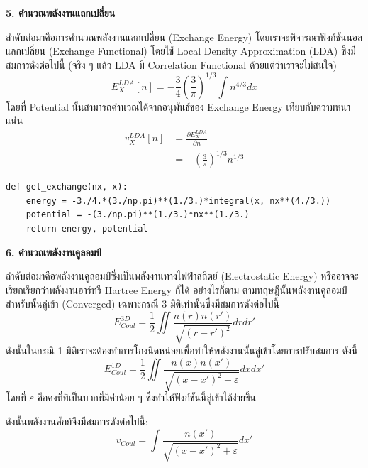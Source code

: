 \noindent \textbf{5. คำนวณพลังงานแลกเปลี่ยน}

ลำดับต่อมาคือการคำนวณพลังงานแลกเปลี่ยน (Exchange Energy) โดยเราจะพิจารณาฟังก์ชันนอลแลกเปลี่ยน (Exchange Functional) โดยใช้ Local Density Approximation (LDA) ซึ่งมีสมการดังต่อไปนี้ (จริง ๆ แล้ว LDA มี Correlation Functional ด้วยแต่ว่าเราจะไม่สนใจ)
%
\begin{equation}
    E_X^{LDA}[n] = -\frac{3}{4} \left(\frac{3}{\pi}\right)^{1/3} \int n^{4/3} dx
\end{equation}
%
\noindent โดยที่ Potential นั้นสามารถคำนวณได้จากอนุพันธ์ของ Exchange Energy เทียบกับความหนาแน่น
%
\begin{align}
    v_X^{LDA}[n] & = \frac{\partial E_X^{LDA}}{\partial n} \nonumber \\
                 & = - \left(\frac{3}{\pi}\right)^{1/3} n^{1/3}
\end{align}

\vspace{1em}

\begin{lstlisting}[style=MyPython]
def get_exchange(nx, x):
    energy = -3./4.*(3./np.pi)**(1./3.)*integral(x, nx**(4./3.))
    potential = -(3./np.pi)**(1./3.)*nx**(1./3.)
    return energy, potential
\end{lstlisting}

\vspace{1em}

\noindent \textbf{6. คำนวณพลังงานคูลอมป์}

ลำดับต่อมาคือพลังงานคูลอมป์ซึ่งเป็นพลังงานทางไฟฟ้าสถิตย์ (Electrostatic Energy) หรืออาจจะเรียกเรียกว่าพลังงานฮาร์ทรี Hartree Energy ก็ได้ อย่างไรก็ตาม ตามทฤษฎีนั้นพลังงานคูลอมป์สำหรับนั้นลู่เข้า (Converged) เฉพาะกรณี 3 มิติเท่านั้นซึ่งมีสมการดังต่อไปนี้
%
\begin{equation}
    E^{3D}_{Coul} = \frac{1}{2}\iint \frac{n(r)n(r')}{\sqrt{(r-r')^2}}drdr'
\end{equation}
%
\noindent ดังนั้นในกรณี 1 มิติเราจะต้องทำการโกงนิดหน่อยเพื่อทำให้พลังงานนั้นลู่เข้าโดยการปรับสมการ ดังนี้
%
\begin{equation}
    E^{1D}_{Coul} = \frac{1}{2}\iint \frac{n(x)n(x')}{\sqrt{(x-x')^2+\varepsilon}}dxdx'
\end{equation}
%
\noindent โดยที่ $\varepsilon$ คือคงที่ที่เป็นบวกที่มีค่าน้อย ๆ ซึ่งทำให้ฟังก์ชันนี้ลู่เข้าได้ง่ายขึ้น

\noindent ดังนั้นพลังงานศักย์จึงมีสมการดังต่อไปนี้:
%
\begin{equation}
    v_{Coul} = \int \frac{n(x')}{\sqrt{(x-x')^2+\varepsilon}}dx'
\end{equation}

